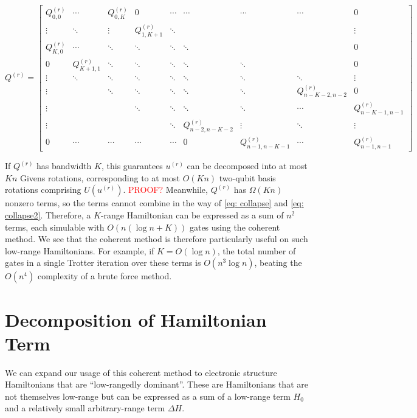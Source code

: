 \begin{equation}
    Q^{(r)} = \begin{bmatrix}
        Q^{(r)}_{0, 0} & \cdots & Q^{(r)}_{0, K} & 0 & \cdots & \cdots & \cdots & \cdots & 0 \\
        \vdots & \ddots & \vdots & Q^{(r)}_{1, K + 1} & \ddots & & & & \vdots \\
        Q^{(r)}_{K, 0} & \cdots & \ddots & \ddots & \ddots & \ddots & & & 0 \\
        0 & Q^{(r)}_{K + 1, 1} & \ddots & \ddots & \ddots & \ddots & \ddots & & 0 \\
        \vdots & \ddots & \ddots & \ddots & \ddots & \ddots & \ddots & \ddots & \vdots \\
        \vdots & & \ddots & \ddots & \ddots & \ddots & \ddots & Q^{(r)}_{n - K - 2, n - 2} & 0 \\
        \vdots & & & \ddots & \ddots & \ddots & \ddots & \cdots & Q^{(r)}_{n - K - 1, n - 1} \\
        \vdots & & & & \ddots & Q^{(r)}_{n - 2, n - K - 2} & \vdots & \ddots & \vdots \\
        0 & \cdots & \cdots & \cdots & \cdots & 0 & Q^{(r)}_{n - 1, n - K - 1} & \cdots & Q^{(r)}_{n - 1, n - 1}
    \end{bmatrix}
\end{equation}

If $Q^{(r)}$ has bandwidth $K$, this guarantees $u^{(r)}$ can be decomposed into at most $Kn$ Givens rotations, corresponding to at most $O(Kn)$ two-qubit basis rotations comprising $U(u^{(r)})$. \textcolor{red}{PROOF?} Meanwhile, $Q^{(r)}$ has $\Omega(Kn)$ nonzero terms, so the terms cannot combine in the way of \eqref{eq: collapse} and \eqref{eq: collapse2}. Therefore, a $K$-range Hamiltonian can be expressed as a sum of $n^2$ terms, each simulable with $O(n(\log{n} + K))$ gates using the coherent method. We see that the coherent method is therefore particularly useful on such low-range Hamiltonians. For example, if $K = O(\log{n})$, the total number of gates in a single Trotter iteration over these terms is $O(n^3\log{n})$, beating the $O(n^4)$ complexity of a brute force method.

\section{Decomposition of Hamiltonian Term}

We can expand our usage of this coherent method to electronic structure Hamiltonians that are ``low-rangedly dominant''. These are Hamiltonians that are not themselves low-range but can be expressed as a sum of a low-range term $H_0$ and a relatively small arbitrary-range term $\Delta H$.

